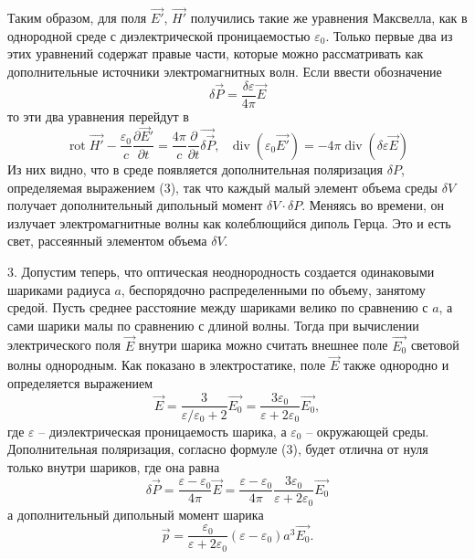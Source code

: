 \documentclass[14pt]{article}
\begin{document}
Таким образом, для поля $\vec{E'}$, $\vec{H'}$ получились такие же уравнения Максвелла, как в однородной среде с диэлектрической проницаемостью $\varepsilon_0$. Только первые два из этих уравнений содержат правые части, которые можно рассматривать как дополнительные источники электромагнитных волн. Если ввести обозначение
\begin{equation}
	\delta\vec{P} = \frac{\delta\varepsilon}{4\pi}\vec{E}
\end{equation}
то эти два уравнения перейдут в
\begin{equation}
	\operatorname{rot}\vec{H'} - \frac{\varepsilon_0}{c}\frac{\partial\vec E'}{\partial t} = \frac{4\pi}{c}\frac{\partial}{\partial t}\vec{\delta\vec{P}},~~~
	\operatorname{div}(\varepsilon_0\vec{E'}) = -4\pi\operatorname{div}(\delta\varepsilon\vec{E})
\end{equation}
Из них видно, что в среде появляется дополнительная поляризация $\delta P$, определяемая выражением (3), так что каждый малый элемент объема среды $\delta V$ получает дополнительный дипольный момент $\delta V\cdot\delta P$. Меняясь во времени, он излучает электромагнитные волны как колеблющийся диполь Герца. Это и есть свет, рассеянный элементом объема $\delta V$.

3. Допустим теперь, что оптическая неоднородность создается одинаковыми шариками радиуса $a$, беспорядочно распределенными по объему, занятому средой. Пусть среднее расстояние между шариками велико по сравнению с $a$, а сами шарики малы по сравнению с длиной волны. Тогда при вычислении электрического поля $\vec{E}$ внутри шарика можно считать внешнее поле $\vec{E_0}$ световой волны однородным. Как показано в электростатике, поле $\vec{E}$ также однородно и определяется выражением
\begin{equation}
	\vec{E} = \frac{3}{\varepsilon/\varepsilon_0 + 2}\vec{E_0} = \frac{3\varepsilon_0}{\varepsilon + 2\varepsilon_0}\vec{E_0},
\end{equation}
где $\varepsilon$ -- диэлектрическая проницаемость шарика, а $\varepsilon_0$ -- окружающей среды. Дополнительная поляризация, согласно формуле (3), будет отлична от нуля только внутри шариков, где она равна
$$
	\delta\vec{P} = \frac{\varepsilon-\varepsilon_0}{4\pi}\vec{E} = \frac{\varepsilon-\varepsilon_0}{4\pi}\frac{3\varepsilon_0}{\varepsilon + 2\varepsilon_0}\vec{E_0}
$$
а дополнительный дипольный момент шарика
\begin{equation}
	\vec{p} = \frac{\varepsilon_0}{\varepsilon + 2\varepsilon_0}(\varepsilon - \varepsilon_0)a^3\vec{E_0}.
\end{equation}
\end{document}
